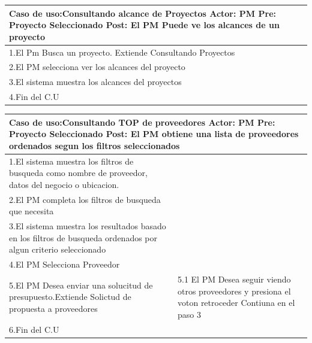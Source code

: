 \begin{longtable}{|p{}|p{}|}
    \hline
    \multicolumn{2}{|p{16cm}|}{
        \textbf{Caso de uso:}Consultando alcance de Proyectos\newline
        \textbf{Actor:} PM\newline
        \textbf{Pre: }Proyecto Seleccionado\newline
        \textbf{Post:} El PM Puede ve los alcances de un proyecto
    }\\
    \hline
    1.El Pm Busca un proyecto. Extiende Consultando Proyectos& \\
    \hline
    2.El PM selecciona ver los alcances del proyecto&  \\
    \hline
    3.El sistema muestra los alcances del proyectos& \\
    \hline
    4.Fin del C.U&\\
    \hline
\end{longtable}

\begin{longtable}{|p{}|p{}|}
    \hline
    \multicolumn{2}{|p{16cm}|}{
        \textbf{Caso de uso:}Consultando TOP de proveedores\newline
        \textbf{Actor:} PM\newline
        \textbf{Pre: }Proyecto Seleccionado\newline
        \textbf{Post:} El PM obtiene una lista de proveedores ordenados segun los filtros seleccionados
    }\\
    \hline
    1.El sistema muestra los filtros de busqueda como nombre de proveedor, datos del negocio o ubicacion. & \\
    \hline
    2.El PM completa los filtros de busqueda que necesita&  \\
    \hline
    3.El sistema muestra los resultados basado en los filtros de busqueda ordenados por algun criterio seleccionado& \\
    \hline
    4.El PM Selecciona Proveedor &\\
    \hline
    5.El PM Desea enviar una solucitud de presupuesto.Extiende Solictud de propuesta a proveedores &5.1 El PM Desea seguir viendo otros proveedores y presiona el voton retroceder \newline 5.2 Contiuna en el paso 3\\
    \hline
    6.Fin del C.U&\\
    \hline
\end{longtable}


